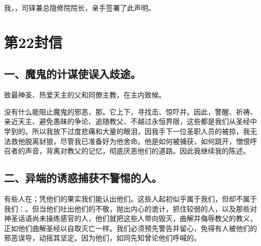 我，，司铎兼总隐修院院长，亲手签署了此声明。\par



\section{第22封信}

\par


\subsection{一、魔鬼的计谋使误入歧途。}

致最神圣、热爱天主的父和同僚主教，在主内致候。\par

没有什么能阻止魔鬼的邪恶，那。它上下，寻找击、惊吓并。因此，警醒、祈祷、亲近天主、避免愚昧的争论、追随教父、不越过永恒界限，这些都是我们从圣经中学到的。所以我放下过度悲痛和大量的眼泪，因我手下一位圣职人员的被掠，我无法救他脱离豺狼，尽管我已准备好为他舍命。他是如何被捕获，如何跳开，憎恨呼召者的声音，背离对教父的记忆，彻底厌恶他们的道路。因此我继续我的陈述。\par


\subsection{二、异端的诱惑捕获不警惕的人。}

有些人在；凭他们的果实我们能认出他们。这些人起初似乎属于我们，但却不属于我们：。但当他们吐出他们的不敬，抛出内心的诡计，抓住较弱的人，以及那些对神圣话语尚未操练感官的人，他们就把这些人带向毁灭，曲解并侮辱教父的教义，正如他们曲解圣经以自取灭亡一样。我们必须预先警告并留心，免得有人被他们的邪恶误导，动摇其坚定。因为他们，如同先知曾论他们呼喊的。\par

